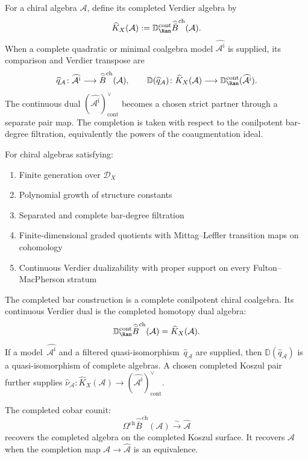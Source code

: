 \begin{definition}\label{def:completed-dual}
For a chiral algebra $\mathcal{A}$, define its completed Verdier
algebra by
\[
\widehat K_X(\mathcal A):=
\mathbb{D}^{\mathrm{cont}}_{\Ran}
\widehat{\bar{B}}^{\mathrm{ch}}(\mathcal{A}).
\]
When a complete quadratic or minimal coalgebra model
$\widehat{\mathcal A^{\mathrm i}}$ is supplied, its comparison and
Verdier transpose are
\[
\widehat q_{\mathcal A}\colon\widehat{\mathcal A^{\mathrm i}}
\longrightarrow\widehat{\bar B}^{\mathrm{ch}}(\mathcal A),
\qquad
\mathbb D(\widehat q_{\mathcal A})\colon\widehat K_X(\mathcal A)
\longrightarrow\mathbb D^{\mathrm{cont}}_{\Ran}
(\widehat{\mathcal A^{\mathrm i}}).
\]
The continuous dual
$(\widehat{\mathcal A^{\mathrm i}})^\vee_{\mathrm{cont}}$ becomes a
chosen strict partner through a separate pair map.
The completion is taken with respect to the conilpotent
bar-degree filtration, equivalently the powers of the coaugmentation
ideal.
\end{definition}

\begin{theorem}\label{thm:completion-koszul}
For chiral algebras satisfying:
\begin{enumerate}
\item Finite generation over $\mathcal{D}_X$
\item Polynomial growth of structure constants
\item Separated and complete bar-degree filtration
\item Finite-dimensional graded quotients with Mittag--Leffler
 transition maps on cohomology
\item Continuous Verdier dualizability with proper support on every
 Fulton--MacPherson stratum
\end{enumerate}

The completed bar construction is a complete conilpotent chiral
coalgebra. Its continuous Verdier dual is the completed homotopy
dual algebra:
\[
\mathbb{D}^{\mathrm{cont}}_{\Ran}
\widehat{\bar{B}}^{\mathrm{ch}}(\mathcal{A})
=\widehat K_X(\mathcal A).
\]
If a model~$\widehat{\mathcal A^{\mathrm i}}$ and a filtered
quasi-isomorphism~$\widehat q_{\mathcal A}$ are supplied, then
$\mathbb D(\widehat q_{\mathcal A})$ is a quasi-isomorphism of complete
algebras.  A chosen completed Koszul pair further supplies
$\widehat\nu_{\mathcal A}\colon\widehat K_X(\mathcal A)\to
(\widehat{\mathcal A^{\mathrm i}})^\vee_{\mathrm{cont}}$.

The completed cobar counit:
\[
\Omega^{\mathrm{ch}}\widehat{\bar{B}}^{\mathrm{ch}}(\mathcal{A})
\xrightarrow{\sim} \widehat{\mathcal{A}}
\]
recovers the completed algebra on the completed Koszul surface. It
recovers $\mathcal{A}$ when the completion map
$\mathcal{A}\to\widehat{\mathcal{A}}$ is an equivalence.
\end{theorem}

